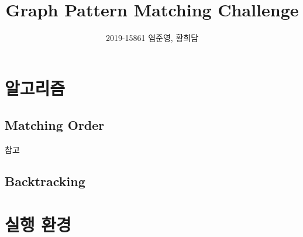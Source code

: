 \documentclass{article}
\author{2019-15861 염준영, 황희담}
\title{Graph Pattern Matching Challenge}
\begin{document}
\maketitle
\section{알고리즘}
\subsection{Matching Order}
참고\cite{한명지2018AEAf}
\subsection{Backtracking}
\section{실행 환경}
    
\printbibliography
\end{document}
